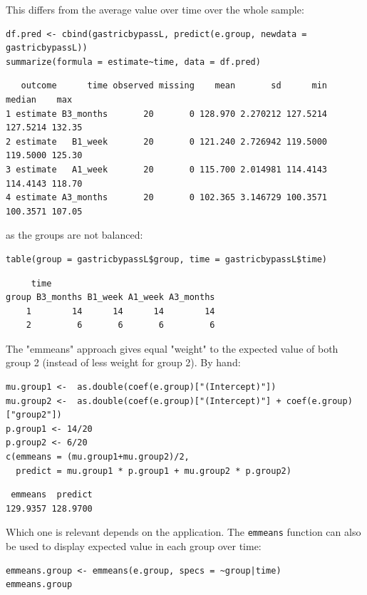 \documentclass[12pt]{article}
\begin{document}
This differs from the average value over time over the whole sample:
\lstset{language=r,label= ,caption= ,captionpos=b,numbers=none}
\begin{lstlisting}
df.pred <- cbind(gastricbypassL, predict(e.group, newdata = gastricbypassL))
summarize(formula = estimate~time, data = df.pred)
\end{lstlisting}

\begin{verbatim}
   outcome      time observed missing    mean       sd      min   median    max
1 estimate B3_months       20       0 128.970 2.270212 127.5214 127.5214 132.35
2 estimate   B1_week       20       0 121.240 2.726942 119.5000 119.5000 125.30
3 estimate   A1_week       20       0 115.700 2.014981 114.4143 114.4143 118.70
4 estimate A3_months       20       0 102.365 3.146729 100.3571 100.3571 107.05
\end{verbatim}


as the groups are not balanced:
\lstset{language=r,label= ,caption= ,captionpos=b,numbers=none}
\begin{lstlisting}
table(group = gastricbypassL$group, time = gastricbypassL$time)
\end{lstlisting}

\begin{verbatim}
     time
group B3_months B1_week A1_week A3_months
    1        14      14      14        14
    2         6       6       6         6
\end{verbatim}


The "emmeans" approach gives equal "weight" to the expected value of
both group 2 (instead of less weight for group 2). By hand:
\lstset{language=r,label= ,caption= ,captionpos=b,numbers=none}
\begin{lstlisting}
mu.group1 <-  as.double(coef(e.group)["(Intercept)"])
mu.group2 <-  as.double(coef(e.group)["(Intercept)"] + coef(e.group)["group2"])
p.group1 <- 14/20
p.group2 <- 6/20
c(emmeans = (mu.group1+mu.group2)/2,
  predict = mu.group1 * p.group1 + mu.group2 * p.group2)
\end{lstlisting}

\begin{verbatim}
 emmeans  predict 
129.9357 128.9700
\end{verbatim}


Which one is relevant depends on the application. The \texttt{emmeans}
function can also be used to display expected value in each group over
time:
\lstset{language=r,label= ,caption= ,captionpos=b,numbers=none}
\begin{lstlisting}
emmeans.group <- emmeans(e.group, specs = ~group|time)
emmeans.group
\end{lstlisting}
\end{document}
